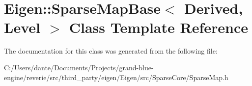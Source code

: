 \hypertarget{class_eigen_1_1_sparse_map_base}{}\section{Eigen\+::Sparse\+Map\+Base$<$ Derived, Level $>$ Class Template Reference}
\label{class_eigen_1_1_sparse_map_base}


The documentation for this class was generated from the following file\+:\begin{DoxyCompactItemize}
\item 
C\+:/\+Users/dante/\+Documents/\+Projects/grand-\/blue-\/engine/reverie/src/third\+\_\+party/eigen/\+Eigen/src/\+Sparse\+Core/Sparse\+Map.\+h\end{DoxyCompactItemize}
